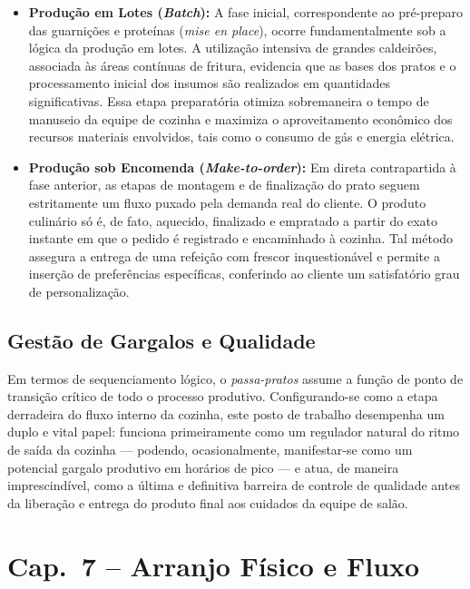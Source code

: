 \documentclass[12pt, a4paper]{article}
\begin{document}
\begin{itemize}
    \item \textbf{Produção em Lotes (\textit{Batch}):} A fase inicial, correspondente ao pré-preparo das guarnições e proteínas (\textit{mise en place}), ocorre fundamentalmente sob a lógica da produção em lotes. A utilização intensiva de grandes caldeirões, associada às áreas contínuas de fritura, evidencia que as bases dos pratos e o processamento inicial dos insumos são realizados em quantidades significativas. Essa etapa preparatória otimiza sobremaneira o tempo de manuseio da equipe de cozinha e maximiza o aproveitamento econômico dos recursos materiais envolvidos, tais como o consumo de gás e energia elétrica.
    \item \textbf{Produção sob Encomenda (\textit{Make-to-order}):} Em direta contrapartida à fase anterior, as etapas de montagem e de finalização do prato seguem estritamente um fluxo puxado pela demanda real do cliente. O produto culinário só é, de fato, aquecido, finalizado e empratado a partir do exato instante em que o pedido é registrado e encaminhado à cozinha. Tal método assegura a entrega de uma refeição com frescor inquestionável e permite a inserção de preferências específicas, conferindo ao cliente um satisfatório grau de personalização.
\end{itemize}

\subsection{Gestão de Gargalos e Qualidade}
Em termos de sequenciamento lógico, o \textit{passa-pratos} assume a função de ponto de transição crítico de todo o processo produtivo. Configurando-se como a etapa derradeira do fluxo interno da cozinha, este posto de trabalho desempenha um duplo e vital papel: funciona primeiramente como um regulador natural do ritmo de saída da cozinha — podendo, ocasionalmente, manifestar-se como um potencial gargalo produtivo em horários de pico — e atua, de maneira imprescindível, como a última e definitiva barreira de controle de qualidade antes da liberação e entrega do produto final aos cuidados da equipe de salão.

\section{Cap.~7 – Arranjo Físico e Fluxo}
\end{document}
